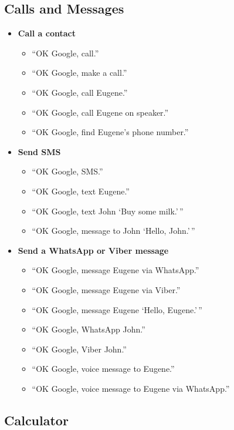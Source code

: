 \documentclass[
  jou,
  floatsintext,
  longtable,
  a4paper,
  nolmodern,
  notxfonts,
  notimes,
  colorlinks=true,linkcolor=blue,citecolor=blue,urlcolor=blue]{apa7}
\providecommand{\tightlist}{%
  \setlength{\itemsep}{0pt}\setlength{\parskip}{0pt}}
\begin{document}
\subsection{Calls and Messages}\label{calls-and-messages}

\begin{itemize}
\tightlist
\item
  \textbf{Call a contact}

  \begin{itemize}
  \tightlist
  \item
    ``OK Google, call.''
  \item
    ``OK Google, make a call.''
  \item
    ``OK Google, call Eugene.''
  \item
    ``OK Google, call Eugene on speaker.''
  \item
    ``OK Google, find Eugene's phone number.''
  \end{itemize}
\item
  \textbf{Send SMS}

  \begin{itemize}
  \tightlist
  \item
    ``OK Google, SMS.''
  \item
    ``OK Google, text Eugene.''
  \item
    ``OK Google, text John `Buy some milk.'\,''
  \item
    ``OK Google, message to John `Hello, John.'\,''
  \end{itemize}
\item
  \textbf{Send a WhatsApp or Viber message}

  \begin{itemize}
  \tightlist
  \item
    ``OK Google, message Eugene via WhatsApp.''
  \item
    ``OK Google, message Eugene via Viber.''
  \item
    ``OK Google, message Eugene `Hello, Eugene.'\,''
  \item
    ``OK Google, WhatsApp John.''
  \item
    ``OK Google, Viber John.''
  \item
    ``OK Google, voice message to Eugene.''
  \item
    ``OK Google, voice message to Eugene via WhatsApp.''
  \end{itemize}
\end{itemize}

\subsection{Calculator}\label{calculator}
\end{document}

